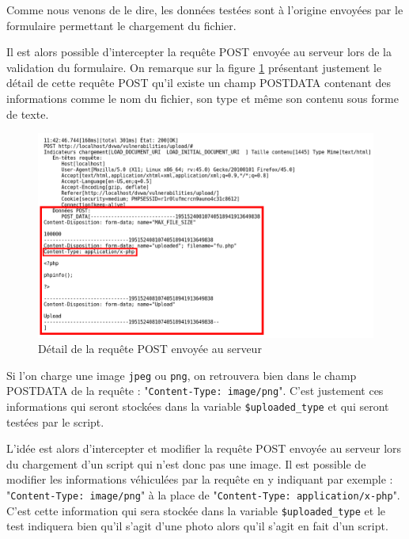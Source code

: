 Comme nous venons de le dire, les données testées sont à l'origine envoyées par le formulaire permettant le chargement du fichier.

Il est alors possible d'intercepter la requête POST envoyée au serveur lors de la validation du formulaire. On remarque sur la figure \ref{fu_dvwa3} présentant justement le détail de cette requête POST qu'il existe un champ POSTDATA contenant des informations comme le nom du fichier, son type et même son contenu sous forme de texte.

\begin{figure}[!h]
\begin{center}
\includegraphics[scale=.45]{images/fu3.png}

\caption{Détail de la requête POST envoyée au serveur}
\label{fu_dvwa3}
\end{center}
\end{figure}

Si l'on charge une image \texttt{jpeg} ou \texttt{png}, on retrouvera bien dans le champ POSTDATA de la requête : "\texttt{Content-Type: image/png}". C'est justement ces informations qui seront stockées dans la variable \texttt{\$uploaded\_type} et qui seront testées par le script.

L'idée est alors d'intercepter et modifier la requête POST envoyée au serveur lors du chargement d'un script qui n'est donc pas une image. Il est possible de modifier les informations véhiculées par la requête en y indiquant par exemple : "\texttt{Content-Type: image/png}" à la place de "\texttt{Content-Type: application/x-php}". C'est cette information qui sera stockée dans la variable \texttt{\$uploaded\_type} et le test indiquera bien qu'il s'agit d'une photo alors qu'il s'agit en fait d'un script.

